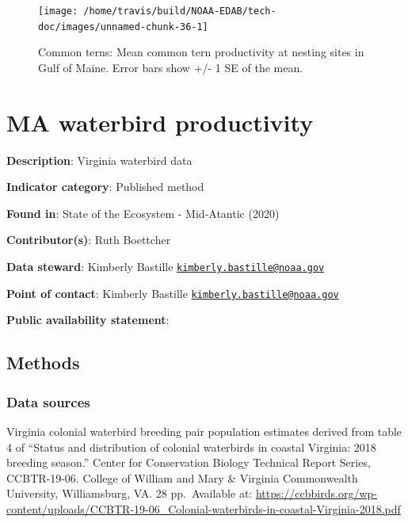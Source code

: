 \documentclass[
]{book}
\begin{document}
\begin{figure}

{\centering \texttt{[image: /home/travis/build/NOAA-EDAB/tech-doc/images/unnamed-chunk-36-1]} 

}

\caption{Common terns: Mean common tern productivity at nesting sites in Gulf of Maine. Error bars show +/- 1 SE of the mean.}\label{fig:unnamed-chunk-36}
\end{figure}

\hypertarget{ma-waterbird-productivity}{%
\chapter{MA waterbird productivity}\label{ma-waterbird-productivity}}

\textbf{Description}: Virginia waterbird data

\textbf{Indicator category}: Published method

\textbf{Found in}: State of the Ecosystem - Mid-Atantic (2020)

\textbf{Contributor(s)}: Ruth Boettcher

\textbf{Data steward}: Kimberly Bastille \href{mailto:kimberly.bastille@noaa.gov}{\nolinkurl{kimberly.bastille@noaa.gov}}

\textbf{Point of contact}: Kimberly Bastille \href{mailto:kimberly.bastille@noaa.gov}{\nolinkurl{kimberly.bastille@noaa.gov}}

\textbf{Public availability statement}:

\hypertarget{methods-33}{%
\section{Methods}\label{methods-33}}

\hypertarget{data-sources-33}{%
\subsection{Data sources}\label{data-sources-33}}

Virginia colonial waterbird breeding pair population estimates derived from table 4 of ``Status and distribution of colonial waterbirds in coastal Virginia: 2018 breeding season.'' Center for Conservation Biology Technical Report Series, CCBTR-19-06. College of William and Mary \& Virginia Commonwealth University, Williamsburg, VA. 28 pp.~Available at: \url{https://ccbbirds.org/wp-content/uploads/CCBTR-19-06_Colonial-waterbirds-in-coastal-Virginia-2018.pdf}
\end{document}
